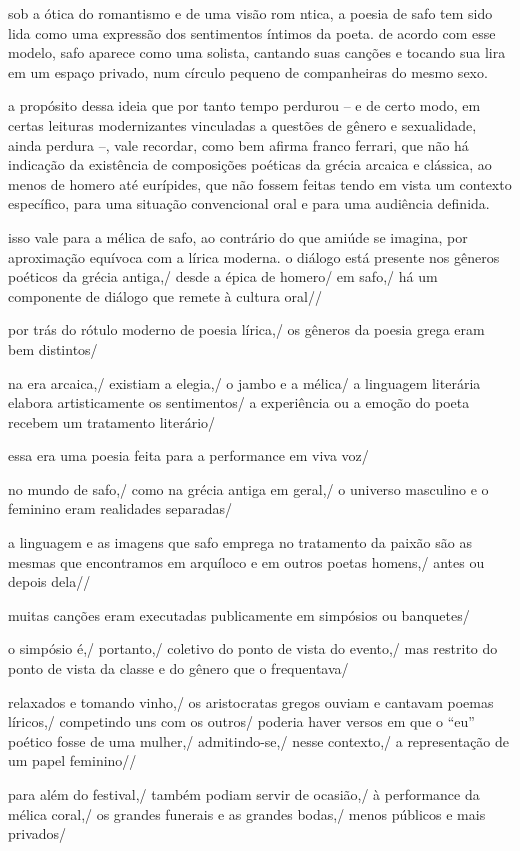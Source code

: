 \documentclass[12pt]{extarticle}
\begin{document}
sob a ótica do romantismo e de uma visão rom ntica, a poesia de safo tem sido lida como uma expressão dos sentimentos íntimos da poeta. de acordo com esse modelo, safo aparece como uma solista, cantando suas canções e tocando sua lira em um espaço privado, num círculo pequeno de companheiras do mesmo sexo.

a propósito dessa ideia que por tanto tempo perdurou – e de certo modo, em certas leituras modernizantes vinculadas a questões de gênero e sexualidade, ainda perdura –, vale recordar, como bem afirma franco ferrari, que não há indicação da existência de composições poéticas da grécia arcaica e clássica, ao menos de homero até eurípides, que não fossem feitas tendo em vista um contexto específico, para uma situação convencional oral e para uma audiência definida. 

isso vale para a mélica de safo, ao contrário do que amiúde se imagina, por aproximação equívoca com a lírica moderna.
o diálogo está presente nos gêneros poéticos da grécia antiga,/ desde a épica de homero/ em safo,/ há um componente de diálogo que remete à cultura oral//
 
por trás do rótulo moderno de poesia lírica,/ os gêneros da poesia grega eram bem distintos/ 
 
na era arcaica,/ existiam a elegia,/ o jambo e a mélica/
a linguagem literária elabora artisticamente os sentimentos/  a experiência ou a emoção do poeta recebem um tratamento literário/
 
essa era uma poesia feita para a performance em viva voz/

no mundo de safo,/ como na grécia antiga em geral,/ o universo masculino e o feminino eram realidades separadas/

a linguagem e as imagens que safo emprega no tratamento da paixão são as mesmas que encontramos em arquíloco e em outros poetas homens,/ antes ou depois dela//

muitas canções eram executadas publicamente em simpósios ou banquetes/

o simpósio é,/ portanto,/ coletivo do ponto de vista do evento,/ mas restrito do ponto de vista da classe e do gênero que o frequentava/

relaxados e tomando vinho,/ os aristocratas gregos ouviam e cantavam poemas líricos,/ competindo uns com os outros/ poderia haver versos em que o “eu” poético fosse de uma mulher,/ admitindo-se,/ nesse contexto,/ a representação de um papel feminino// 

para além do festival,/ também podiam servir de ocasião,/ à performance da mélica coral,/ os grandes funerais e as grandes bodas,/ menos públicos e mais privados/
\end{document}

